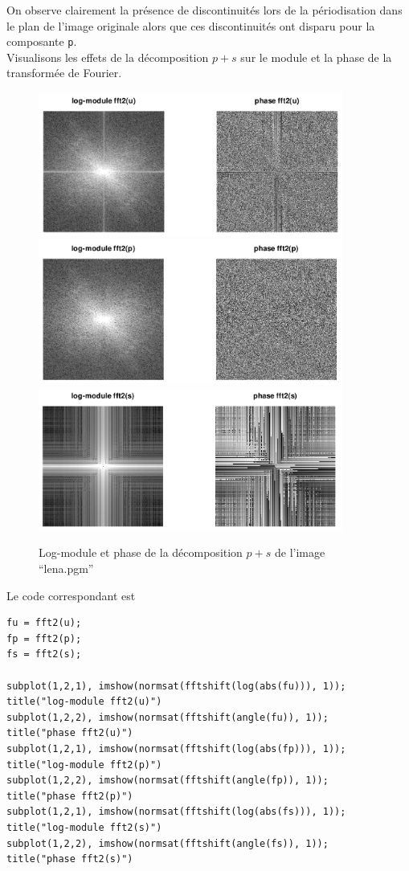 \documentclass[a4paper, 11pt]{article}
\begin{document}
On observe clairement la présence de discontinuités lors de la périodisation dans le plan de l'image originale alors que
ces discontinuités ont disparu pour la composante \texttt{p}. \\

Visualisons les effets de la décomposition $p+s$ sur le module et la phase de la transformée de Fourier.

\begin{figure}[!h]
\centering
\includegraphics[width=10cm]{lena_fft_u.png}
\includegraphics[width=10cm]{lena_fft_p.png}
\includegraphics[width=10cm]{lena_fft_s.png}
\caption{Log-module et phase de la décomposition $p+s$ de l'image “lena.pgm”}
\label{fig:fft}
\end{figure}

Le code correspondant est

\begin{lstlisting}[frame=single]
fu = fft2(u);
fp = fft2(p);
fs = fft2(s);

subplot(1,2,1), imshow(normsat(fftshift(log(abs(fu))), 1));
title("log-module fft2(u)")
subplot(1,2,2), imshow(normsat(fftshift(angle(fu)), 1));
title("phase fft2(u)")
subplot(1,2,1), imshow(normsat(fftshift(log(abs(fp))), 1));
title("log-module fft2(p)")
subplot(1,2,2), imshow(normsat(fftshift(angle(fp)), 1));
title("phase fft2(p)")
subplot(1,2,1), imshow(normsat(fftshift(log(abs(fs))), 1));
title("log-module fft2(s)")
subplot(1,2,2), imshow(normsat(fftshift(angle(fs)), 1));
title("phase fft2(s)")
\end{lstlisting}
\end{document}
